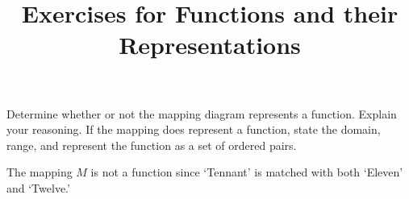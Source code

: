 \documentclass{ximera}
\title{Exercises for Functions and their Representations}
\begin{document}
\begin{abstract}
\end{abstract}
\maketitle





\begin{problem}\label{mappingfirst}
Determine whether or not the mapping diagram represents a function. Explain your reasoning. If the mapping does represent a function, state the domain, range, and represent the function as a set of ordered pairs.


\begin{solution}
The mapping $M$ is not a function since  `Tennant' is matched with both `Eleven' and `Twelve.'
\end{solution}
\end{problem} 
\end{document}

